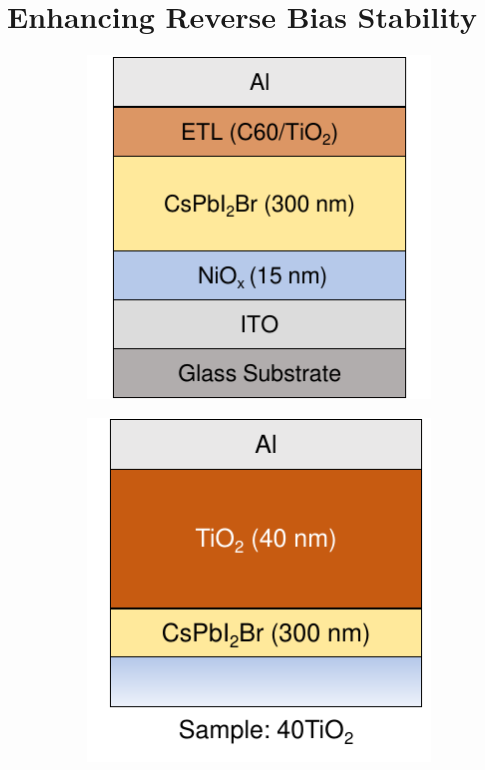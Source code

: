 \section{Enhancing Reverse Bias Stability}

\begin{figure}[htbp]
    \centering
    \begin{subfigure}{0.24\textwidth}
        \centering
        \includegraphics[width=\textwidth]{chapters/transport_layers/images/ETL_optimization_stack.pdf}
        \caption{}
        \label{}
    \end{subfigure}
    \hfill
    \begin{subfigure}{0.24\textwidth}
        \centering
        \includegraphics[width=\textwidth]{chapters/transport_layers/images/ETL_Optimization_40TiO2.pdf}

\end{subfigure}
\end{figure}
